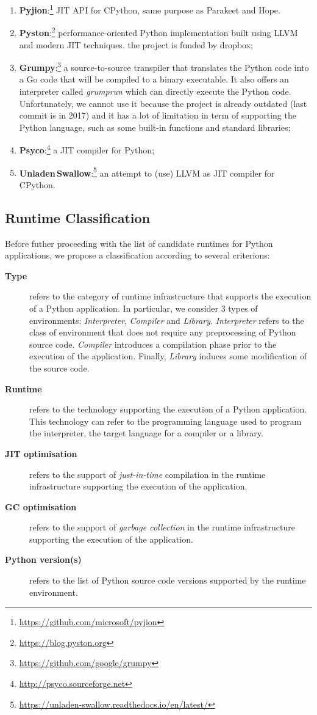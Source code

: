 \begin{enumerate}
    \item \textbf{Pyjion}:\footnote{\url{https://github.com/microsoft/pyjion}} JIT API for CPython, same purpose as Parakeet and Hope.
    \item \textbf{Pyston}:\footnote{\url{https://blog.pyston.org}} performance-oriented Python implementation built using LLVM and modern JIT techniques. the project is funded by dropbox;
    \item \textbf{Grumpy}:\footnote{\url{https://github.com/google/grumpy}} a source-to-source transpiler that translates the Python code into a Go code that will be compiled to a binary executable. It also offers an interpreter called \emph{grumprun} which can directly execute the Python code. Unfortunately, we cannot use it because the project is already outdated (last commit is in 2017) and it has a lot of limitation in term of supporting the Python language, such as some built-in functions and standard libraries;
    \item \textbf{Psyco}:\footnote{\url{http://psyco.sourceforge.net}} a JIT compiler for Python;
    \item \textbf{Unladen\,Swallow}:\footnote{\url{https://unladen-swallow.readthedocs.io/en/latest/}} an attempt to (use) LLVM  as  JIT compiler for CPython.
\end{enumerate}


\subsection{Runtime Classification}
Before futher proceeding with the list of candidate runtimes for Python applications, we propose a classification according to several criterions:
\begin{description}
    \item[\bf Type] refers to the category of runtime infrastructure that supports the execution of a Python application. In particular, we consider 3 types of environments: \emph{Interpreter}, \emph{Compiler} and \emph{Library}. \emph{Interpreter} refers to the class of environment that does not require any preprocessing of Python source code. \emph{Compiler} introduces a compilation phase prior to the execution of the application. Finally, \emph{Library} induces some modification of the source code.
    \item[\bf Runtime] refers to the technology supporting the execution of a Python application. This technology can refer to the programming language used to program the interpreter, the target language for a compiler or a library.
    \item[\bf JIT optimisation] refers to the support of \emph{just-in-time} compilation in the runtime infrastructure supporting the execution of the application.
    \item[\bf GC optimisation] refers to the support of \emph{garbage collection} in the runtime infrastructure supporting the execution of the application.
    \item[\bf Python version(s)] refers to the list of Python source code versions supported by the runtime environment.
\end{description}

